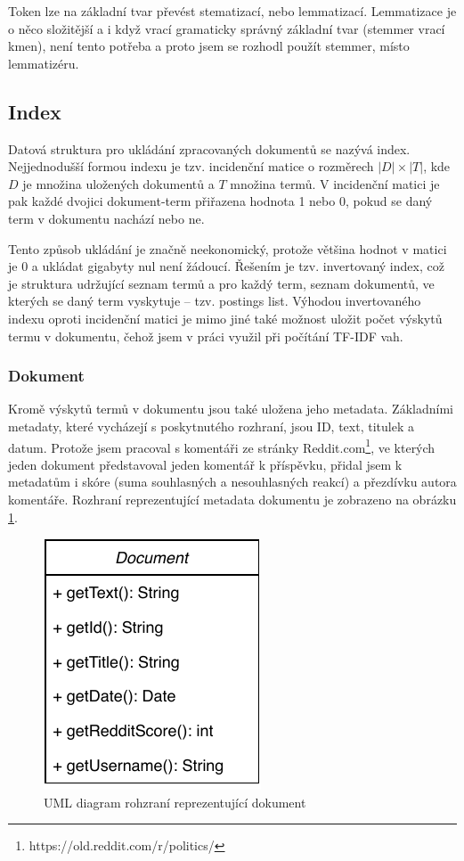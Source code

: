 \documentclass[11pt,a4paper]{scrartcl}
\begin{document}
	Token lze na základní tvar převést stematizací, nebo lemmatizací. Lemmatizace je o něco složitější a i když vrací gramaticky správný základní tvar (stemmer vrací kmen), není tento potřeba a proto jsem se rozhodl použít stemmer, místo lemmatizéru.
	
	\subsection{Index}
	Datová struktura pro ukládání zpracovaných dokumentů se nazývá index. Nejjednodušší formou indexu je tzv. incidenční matice o rozměrech $|D|\times|T|$, kde $D$ je množina uložených dokumentů a $T$ množina termů. V incidenční matici je pak každé dvojici dokument-term přiřazena hodnota 1 nebo 0, pokud se daný term v dokumentu nachází nebo ne. 
	 
	Tento způsob ukládání je značně neekonomický, protože většina hodnot v matici je 0 a ukládat gigabyty nul není žádoucí. Řešením je tzv. invertovaný index, což je struktura udržující seznam termů a pro každý term, seznam dokumentů, ve kterých se daný term vyskytuje -- tzv. postings list. Výhodou invertovaného indexu oproti incidenční matici je mimo jiné také možnost uložit počet výskytů termu v dokumentu, čehož jsem v práci využil při počítání TF-IDF vah.
	
	\subsubsection{Dokument}
	Kromě výskytů termů v dokumentu jsou také uložena jeho metadata. Základními metadaty, které vycházejí s poskytnutého rozhraní, jsou ID, text, titulek a datum. Protože jsem pracoval s komentáři ze stránky Reddit.com\footnote{https://old.reddit.com/r/politics/}, ve kterých jeden dokument představoval jeden komentář k příspěvku, přidal jsem k metadatům i skóre (suma souhlasných a nesouhlasných reakcí) a přezdívku autora komentáře. Rozhraní reprezentující metadata dokumentu je zobrazeno na obrázku \ref{fig:document-uml}.
	
	\begin{figure}[h]
		\centering
		\includegraphics[width=0.3\linewidth]{document-uml}
		\caption{UML diagram rohzraní reprezentující dokument}
		\label{fig:document-uml}
	\end{figure}
	
\end{document}
